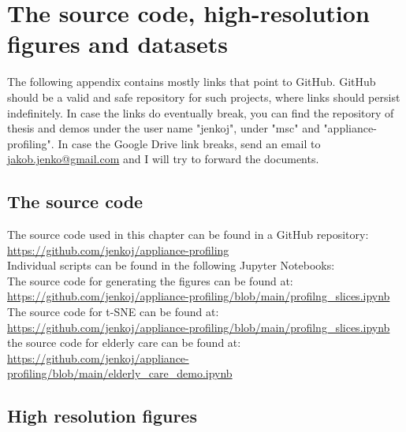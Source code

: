 
\chapter{The source code, high-resolution figures and datasets} %

\label{AppendixA} %

The following appendix contains mostly links that point to GitHub.
GitHub should be a valid and safe repository for such projects, where links should persist indefinitely.
In case the links do eventually break, you can find the repository of thesis and demos under the user name "jenkoj", under "msc" and "appliance-profiling".
In case the Google Drive link breaks, send an email to \url{jakob.jenko@gmail.com} and I will try to forward the documents.

\section{The source code}

The source code used in this chapter can be found in a GitHub repository: \\
\noindent \url{https://github.com/jenkoj/appliance-profiling} \\

\noindent Individual scripts can be found in the following Jupyter Notebooks: \\

\noindent The source code for generating the figures can be found at: \\
\noindent \url{https://github.com/jenkoj/appliance-profiling/blob/main/profilng_slices.ipynb} \\

\noindent The source code for t-SNE can be found at: \\
\noindent \url{https://github.com/jenkoj/appliance-profiling/blob/main/profilng_slices.ipynb} \\

\noindent the source code for elderly care can be found at: \\
\noindent \url{https://github.com/jenkoj/appliance-profiling/blob/main/elderly_care_demo.ipynb} \\

\section{High resolution figures}

